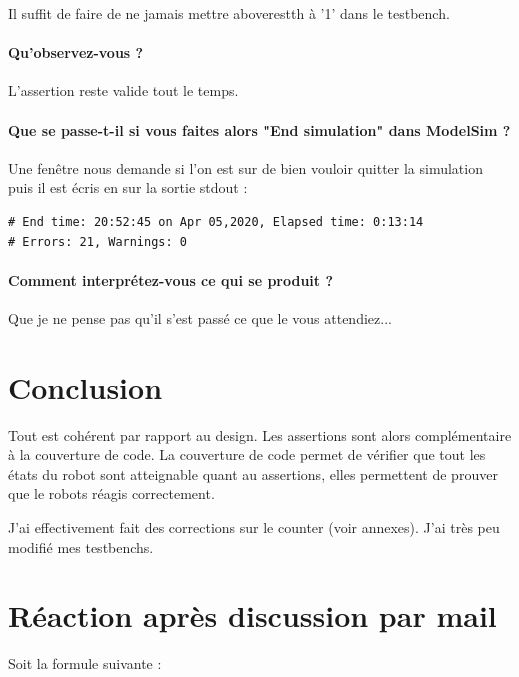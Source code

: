 \documentclass{article}
\newcommand{\sautligne}{
\textbf{\vspace{5mm}}
}
\begin{document}
Il suffit de faire de ne jamais mettre aboverestth à '1' dans le testbench.


\paragraph{Qu'observez-vous ?}

\sautligne

L'assertion reste valide tout le temps.

\paragraph{Que se passe-t-il
si vous faites alors "End simulation" dans ModelSim ?}

\sautligne

Une fenêtre nous demande si l'on est sur de bien vouloir quitter la simulation puis il est écris en sur la sortie stdout : 
\begin{verbatim}
# End time: 20:52:45 on Apr 05,2020, Elapsed time: 0:13:14
# Errors: 21, Warnings: 0
\end{verbatim}

\paragraph{ Comment interprétez-vous ce qui se
produit ?}


\sautligne

Que je ne pense pas qu'il s'est passé ce que le vous attendiez...

\newpage
\section{Conclusion}
Tout est cohérent par rapport au design. Les assertions sont alors complémentaire à la couverture de code. La couverture de code permet de vérifier que tout les états du robot sont atteignable quant au assertions, elles permettent de prouver que le robots réagis correctement.
\sautligne

J'ai effectivement fait des corrections sur le counter (voir annexes). J'ai très peu modifié mes testbenchs.

\section{Réaction après discussion par mail}
\label{CTFO}
Soit la formule suivante  :
\vspace{2mm}
\end{document}
